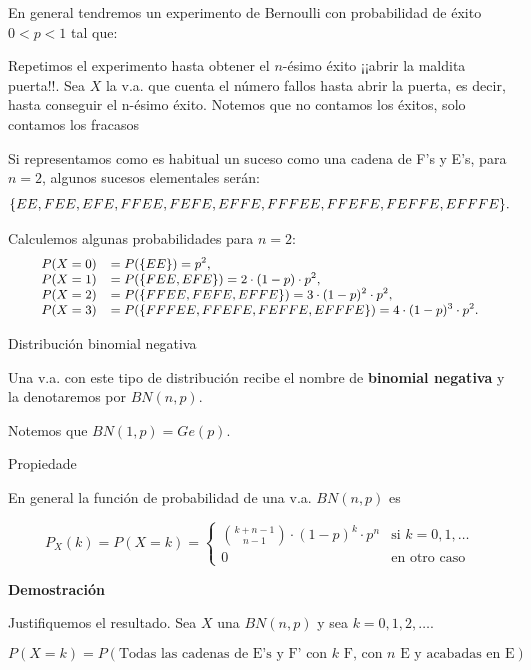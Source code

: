 \documentclass[
  letterpaper,
  DIV=11,
  numbers=noendperiod]{scrreprt}
\begin{document}
En general tendremos un experimento de Bernoulli con probabilidad de
éxito \(0<p<1\) tal que:

Repetimos el experimento hasta obtener el \(n\)-ésimo éxito ¡¡abrir la
maldita puerta!!. Sea \(X\) la v.a. que cuenta el número fallos hasta
abrir la puerta, es decir, hasta conseguir el n-ésimo éxito. Notemos que
no contamos los éxitos, solo contamos los fracasos

Si representamos como es habitual un suceso como una cadena de F's y
E's, para \(n=2\), algunos sucesos elementales serán:
\[\small{\{EE,FEE,EFE, FFEE,FEFE,EFFE,FFFEE,FFEFE,FEFFE,EFFFE\}.}\]

Calculemos algunas probabilidades para \(n=2\): \[
\small{
\begin{array}{rl}
P(X=0) & =P(\{EE\})=p^2, \\
P(X=1) & =P(\{FEE,EFE\})=2\cdot (1-p)\cdot p^2, \\
P(X=2) & =P(\{FFEE,FEFE,EFFE\})=3\cdot (1-p)^2\cdot p^2, \\
P(X=3) & =P(\{FFFEE,FFEFE,FEFFE,EFFFE\})=4\cdot (1-p)^3\cdot p^2.
\end{array}
}
\]

\begin{Definicion}{Distribución binomial negativa}{}

Una v.a. con este tipo de distribución recibe el nombre de
\textbf{binomial negativa} y la denotaremos por \(BN(n,p)\).

Notemos que \(BN(1,p)=Ge(p)\).

\end{Definicion}

\begin{Proposicion}{Propiedade}{}

En general la función de probabilidad de una v.a. \(BN(n,p)\) es

\[
P_{X}(k)=P(X=k)=\left\{\begin{array}{ll}
 {k+n-1\choose n-1} \cdot (1-p)^{k}\cdot p^n & \mbox{si } k=0,1,\ldots\\
 0 & \mbox{en otro caso}\end{array}\right.
\]

\end{Proposicion}

\textbf{Demostración}

Justifiquemos el resultado. Sea \(X\) una \(BN(n,p)\) y sea
\(k=0,1,2,\ldots\).

\[P(X=k)=P(\mbox{Todas las cadenas de E's y F' con $k$ F, con $n$ E y acabadas en E})\]
\end{document}

